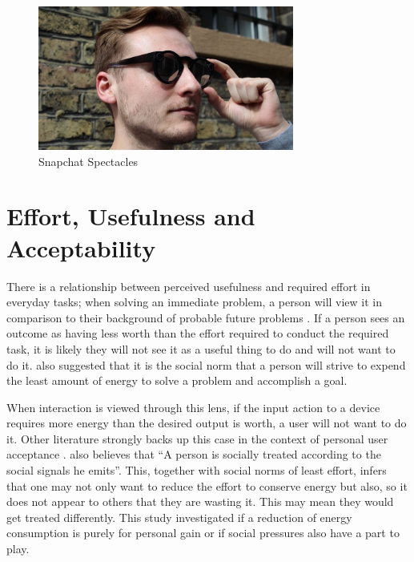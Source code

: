 \documentclass{l4proj}
\begin{document}
\begin{figure}[h!]
    \centering
    \includegraphics[width=0.75\textwidth]{images/spectacles.jpg}
        \caption{Snapchat Spectacles}
        \label{fig:Spectacles}
\end{figure}

\section{Effort, Usefulness and Acceptability}

There is a relationship between perceived usefulness and required effort in everyday tasks; when solving an immediate problem, a person will view it in comparison to their background of probable future problems \citep{zipf_human_2016}.  If a person sees an outcome as having less worth than the effort required to conduct the required task, it is likely they will not see it as a useful thing to do and will not want to do it. \citet{zipf_human_2016} also suggested that it is the social norm that a person will strive to expend the least amount of energy to solve a problem and accomplish a goal.

When interaction is viewed through this lens, if the input action to a device requires more energy than the desired output is worth, a user will not want to do it. Other literature strongly backs up this case in the context of personal user acceptance \citep{davis_perceived_1989}. \citet{zipf_human_2016} also believes that ``A person is socially treated according to the social signals he emits''. This, together with social norms of least effort, infers that one may not only want to reduce the effort to conserve energy but also, so it does not appear to others that they are wasting it. This may mean they would get treated differently. This study investigated if a reduction of energy consumption is purely for personal gain or if social pressures also have a part to play. 
\end{document}

